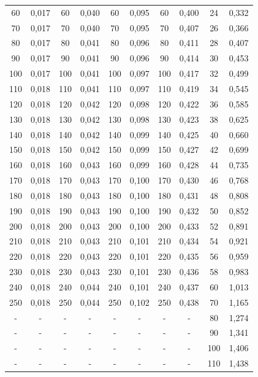 \begin{table}[H]
\begin{tabular}{c c c c c c c c c c}
60  & 0,017 & 60  & 0,040 & 60  & 0,095 & 60  & 0,400 & 24  & 0,332 \\
70  & 0,017 & 70  & 0,040 & 70  & 0,095 & 70  & 0,407 & 26  & 0,366 \\
80  & 0,017 & 80  & 0,041 & 80  & 0,096 & 80  & 0,411 & 28  & 0,407 \\
90  & 0,017 & 90  & 0,041 & 90  & 0,096 & 90  & 0,414 & 30  & 0,453 \\
100 & 0,017 & 100 & 0,041 & 100 & 0,097 & 100 & 0,417 & 32  & 0,499 \\
110 & 0,018 & 110 & 0,041 & 110 & 0,097 & 110 & 0,419 & 34  & 0,545 \\
120 & 0,018 & 120 & 0,042 & 120 & 0,098 & 120 & 0,422 & 36  & 0,585 \\
130 & 0,018 & 130 & 0,042 & 130 & 0,098 & 130 & 0,423 & 38  & 0,625 \\
140 & 0,018 & 140 & 0,042 & 140 & 0,099 & 140 & 0,425 & 40  & 0,660 \\
150 & 0,018 & 150 & 0,042 & 150 & 0,099 & 150 & 0,427 & 42  & 0,699 \\
160 & 0,018 & 160 & 0,043 & 160 & 0,099 & 160 & 0,428 & 44  & 0,735 \\
170 & 0,018 & 170 & 0,043 & 170 & 0,100 & 170 & 0,430 & 46  & 0,768 \\
180 & 0,018 & 180 & 0,043 & 180 & 0,100 & 180 & 0,431 & 48  & 0,808 \\
190 & 0,018 & 190 & 0,043 & 190 & 0,100 & 190 & 0,432 & 50  & 0,852 \\
200 & 0,018 & 200 & 0,043 & 200 & 0,100 & 200 & 0,433 & 52  & 0,891 \\
210 & 0,018 & 210 & 0,043 & 210 & 0,101 & 210 & 0,434 & 54  & 0,921 \\
220 & 0,018 & 220 & 0,043 & 220 & 0,101 & 220 & 0,435 & 56  & 0,959 \\
230 & 0,018 & 230 & 0,043 & 230 & 0,101 & 230 & 0,436 & 58  & 0,983 \\
240 & 0,018 & 240 & 0,044 & 240 & 0,101 & 240 & 0,437 & 60  & 1,013 \\
250 & 0,018 & 250 & 0,044 & 250 & 0,102 & 250 & 0,438 & 70  & 1,165 \\
 -  &   -   &  -  &   -   &  -  &   -   &  -  &   -   & 80  & 1,274 \\
 -  &   -   &  -  &   -   &  -  &   -   &  -  &   -   & 90  & 1,341 \\
 -  &   -   &  -  &   -   &  -  &   -   &  -  &   -   & 100 & 1,406 \\
 -  &   -   &  -  &   -   &  -  &   -   &  -  &   -   & 110 & 1,438 \\

\end{tabular}
\end{table}
